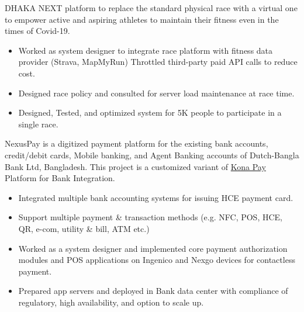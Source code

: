 \documentclass[10pt,a4paper,ragged2e]{altacv}
\begin{document}
{}

DHAKA NEXT platform to replace the standard physical race with a virtual one to empower active and aspiring athletes to maintain their fitness even in the times of Covid-19.

  \begin{itemize}
    \item Worked as system designer to integrate race platform with fitness data provider (Strava, MapMyRun) Throttled third-party paid API calls to reduce cost.
    \item Designed race policy and consulted for server load maintenance at race time.
    \item Designed, Tested, and optimized system for 5K people to participate in a single race.
  \end{itemize}
  









NexusPay is a digitized payment platform for the existing bank accounts, credit/debit cards, Mobile banking, and Agent Banking accounts of Dutch-Bangla Bank Ltd, Bangladesh. This project is a customized variant of \href{https://konasl.com/digitization-platform/kona-pay/}{Kona Pay} Platform for Bank Integration.

  \begin{itemize}
    \item Integrated multiple bank accounting systems for issuing HCE payment card.
    \item Support multiple payment \& transaction methods (e.g. NFC, POS, HCE, QR, e-com, utility \& bill, ATM etc.)
    \item Worked as a system designer and implemented core payment authorization modules and POS applications on Ingenico and Nexgo devices for contactless payment.
    \item Prepared app servers and deployed in Bank data center with compliance of regulatory, high availability, and option to scale up.
  \end{itemize}
  
\end{document}
